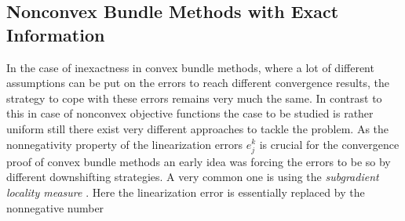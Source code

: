 

\subsection{Nonconvex Bundle Methods with Exact Information}

In the case of inexactness in convex bundle methods, where a lot of different assumptions can be put on the errors to reach different convergence results, the strategy to cope with these errors remains very much the same. In contrast to this in case of nonconvex objective functions the case to be studied is rather uniform still there exist very different approaches to tackle the problem.
As the nonnegativity property of the linearization errors \(e_j^k\) is crucial for the convergence proof of convex bundle methods an early idea was forcing the errors to be so by different downshifting strategies. A very common one is using the \emph{subgradient locality measure} \cite{Kiwiel1986, Mifflin1982}. Here the linearization error is essentially replaced by the nonnegative number

